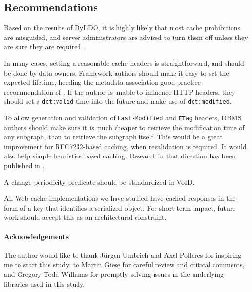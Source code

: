 \documentclass{llncs}
\newcommand{\rdfterm}[1]{\texttt{#1}}
\newcommand{\httph}[1]{\texttt{#1}}
\begin{document}
\subsection{Recommendations}

Based on the results of DyLDO, it is highly likely that most cache
prohibitions are misguided, and server administrators are advised to
turn them off unless they are sure they are required.

In many cases, setting a reasonable cache headers is straightforward,
and should be done by data owners. Framework authors should make it
easy to set the expected lifetime, heeding the metadata association
good practice recommendation of \cite{Jacobs:04:AWW}. If the author is
unable to influence HTTP headers, they should set a
\rdfterm{dct:valid} time into the future and make use of
\rdfterm{dct:modified}.

To allow generation and validation of \httph{Last-Modified} and
\httph{ETag} headers, DBMS authors should make sure it is much cheaper
to retrieve the modification time of any subgraph, than to retrieve
the subgraph itself. This would be a great improvement for
RFC7232-based caching, when revalidation is required. It would also
help simple heuristics based caching. Research in that direction has
been published in \cite{kaseicache}.

A change periodicity predicate should be standardized in VoID.

All Web cache implementations we have studied have cached responses in
the form of a key that identifies a serialized object. For short-term
impact, future work should accept this as an architectural constraint.

\paragraph*{Acknowledgements} The author would like to thank Jürgen
Umbrich and Axel Polleres for inspiring me to start this study, to
Martin Giese for careful review and critical comments, and Gregory
Todd Williams for promptly solving issues in the underlying libraries
used in this study.


%
%
%

\end{document}

